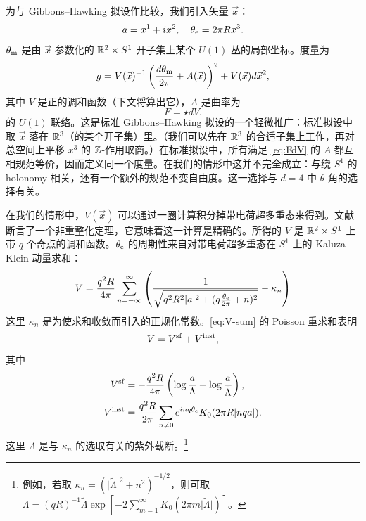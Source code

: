 为与 Gibbons–Hawking 拟设作比较，我们引入矢量 $\vec{x}$：
\begin{equation}
a = x^1 + i x^2, \quad \theta_{\mathrm{e}} = 2 \pi R x^3.
\end{equation}
$\theta_{\mathrm{m}}$ 是由 $\vec{x}$ 参数化的 $\mathbb{R}^2 \times S^1$ 开子集上某个 $U(1)$ 丛的局部坐标。度量为
\begin{equation}
g = V(\vec{x})^{-1} \left(\frac{d \theta_{\mathrm{m}}}{2\pi} + A(\vec{x})\right)^2 + V(\vec{x}) d\vec{x}^2,
\end{equation}
其中 $V$ 是正的调和函数（下文将算出它），$A$ 是曲率为
\begin{equation} \label{eq:FdV}
F = \star dV.
\end{equation}
的 $U(1)$ 联络。这是标准 Gibbons–Hawking 拟设的一个轻微推广：标准拟设中取 $\vec{x}$ 落在 $\mathbb{R}^3$（的某个开子集）里。（我们可以先在 $\mathbb{R}^3$ 的合适子集上工作，再对总空间上平移 $x^3$ 的 $\mathbb{Z}$-作用取商。）在标准拟设中，所有满足 \eqref{eq:FdV} 的 $A$ 都互相规范等价，因而定义同一个度量。在我们的情形中这并不完全成立：与绕 $S^1$ 的 holonomy 相关，还有一个额外的规范不变自由度。这一选择与 $d=4$ 中 $\theta$ 角的选择有关。

在我们的情形中，$V(\vec{x})$ 可以通过一圈计算积分掉带电荷超多重态来得到。文献 \cite{Seiberg:1996ns} 断言了一个非重整化定理，它意味着这一计算是精确的。所得的 $V$ 是 $\mathbb{R}^2 \times S^1$ 上带 $q$ 个奇点的调和函数。$\theta_{\mathrm{e}}$ 的周期性来自对带电荷超多重态在 $S^1$ 上的 Kaluza–Klein 动量求和：
\begin{equation} \label{eq:V-sum}
V = \frac{q^2 R}{4 \pi} \sum_{n=-\infty}^\infty \left( \frac{1}{\sqrt{q^2 R^2 \lvert a \rvert^2 + (q \frac{\theta_{\mathrm{e}}}{2 \pi} + n)^2}} - \kappa_n \right)
\end{equation}
这里 $\kappa_n$ 是为使求和收敛而引入的正规化常数。\eqref{eq:V-sum} 的 Poisson 重求和表明
\begin{equation}
V = V^{\mathrm{sf}} + V^{\mathrm{inst}},
\end{equation}
其中
\begin{align}
V^{\mathrm{sf}} &= -\frac{q^2 R}{4\pi} \left(\log  \frac{a}{\Lambda} + \log \frac{\bar{a}}{\bar{\Lambda}} \right), \\
V^{\mathrm{inst}} &= \frac{q^2 R}{2\pi} \sum_{n\neq 0} e^{i n q \theta_{\mathrm{e}}} K_0(2 \pi R \lvert n q a \rvert). \label{eq:V-inst}
\end{align}
这里 $\Lambda$ 是与 $\kappa_n$ 的选取有关的紫外截断。\footnote{例如，若取 $\kappa_n = (\vert \tilde \Lambda\vert^2 + n^2)^{-1/2}$，则可取 $\Lambda = (qR)^{-1} \tilde\Lambda \exp[-2 \sum_{m=1}^\infty K_0(2\pi m \vert \tilde \Lambda\vert )]$。}

